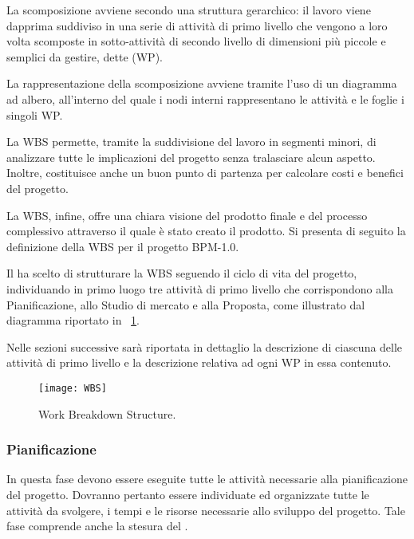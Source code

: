 La scomposizione avviene secondo una struttura gerarchico: il lavoro viene dapprima suddiviso in una serie di attività di primo livello che vengono a loro volta scomposte in sotto-attività di secondo livello di dimensioni più piccole e semplici da gestire, dette  (WP).

La rappresentazione della scomposizione avviene tramite l'uso di un diagramma ad albero, all'interno del quale i nodi interni rappresentano le attività e le foglie i singoli WP\@.

La WBS permette, tramite la suddivisione del lavoro in segmenti minori, di analizzare tutte le implicazioni del progetto senza tralasciare alcun aspetto. Inoltre, costituisce anche un buon punto di partenza per calcolare costi e benefici del progetto.

La WBS, infine, offre una chiara visione del prodotto finale e del processo complessivo attraverso il quale è stato creato il prodotto. Si presenta di seguito la definizione della WBS per il progetto BPM-1.0. 

Il  ha scelto di strutturare la WBS seguendo il ciclo di vita del progetto, individuando in primo luogo tre attività di primo livello che corrispondono alla Pianificazione, allo Studio di mercato e alla Proposta, come illustrato dal diagramma riportato in \figurename~\ref{fig:WBS}. 

Nelle sezioni successive sarà riportata in dettaglio la descrizione di ciascuna delle attività di primo livello e la descrizione relativa ad ogni WP in essa contenuto. 

\begin{figure}[H]
  \centering
  \texttt{[image: WBS]}
  \caption{Work Breakdown Structure.}
  \label{fig:WBS}
\end{figure}

\subsubsection{Pianificazione}
In questa fase devono essere eseguite tutte le attività necessarie alla pianificazione del progetto.
Dovranno pertanto essere individuate ed organizzate tutte le attività da svolgere, i tempi e le risorse necessarie allo sviluppo del progetto. Tale fase comprende anche la stesura del .
		
